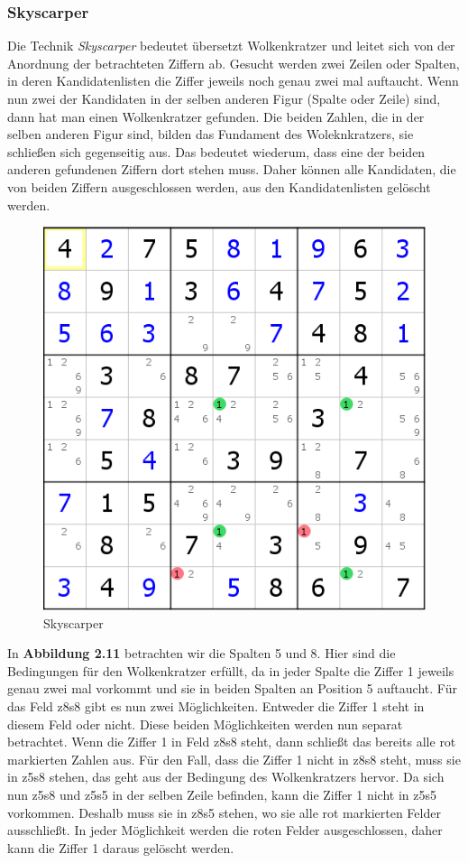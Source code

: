 \newpage
\subsubsection{Skyscarper}
\label{Skyscarper}
Die Technik \textit{Skyscarper} bedeutet übersetzt Wolkenkratzer und leitet sich von der Anordnung der betrachteten Ziffern ab. Gesucht werden zwei Zeilen oder Spalten, in deren Kandidatenlisten die Ziffer jeweils noch genau zwei mal auftaucht. Wenn nun zwei der Kandidaten in der selben anderen Figur (Spalte oder Zeile) sind, dann hat man einen Wolkenkratzer gefunden. Die beiden Zahlen, die in der selben anderen Figur sind, bilden das Fundament des Woleknkratzers, sie schließen sich gegenseitig aus. Das bedeutet wiederum, dass eine der beiden anderen gefundenen Ziffern dort stehen muss. Daher können alle Kandidaten, die von beiden Ziffern ausgeschlossen werden, aus den Kandidatenlisten gelöscht werden.	

\begin{figure}[h]
\begin{center}
\includegraphics{./img/skyscarper.png}
\caption{Skyscarper}
\end{center}
\end{figure}

In \textbf{Abbildung 2.11} betrachten wir die Spalten 5 und 8. Hier sind die Bedingungen für den Wolkenkratzer erfüllt, da in jeder Spalte die Ziffer 1 jeweils genau zwei mal vorkommt und sie in beiden Spalten an Position 5 auftaucht. Für das Feld z8s8 gibt es nun zwei Möglichkeiten. Entweder die Ziffer 1 steht in diesem Feld oder nicht. Diese beiden Möglichkeiten werden nun separat betrachtet. Wenn die Ziffer 1 in Feld z8s8 steht, dann schließt das bereits alle rot markierten Zahlen aus. Für den Fall, dass die Ziffer 1 nicht in z8s8 steht, muss sie in z5s8 stehen, das geht aus der Bedingung des Wolkenkratzers hervor. Da sich nun z5s8 und z5s5 in der selben Zeile befinden, kann die Ziffer 1 nicht in z5s5 vorkommen. Deshalb muss sie in z8s5 stehen, wo sie alle rot markierten Felder ausschließt. In jeder Möglichkeit werden die roten Felder ausgeschlossen, daher kann die Ziffer 1 daraus gelöscht werden.